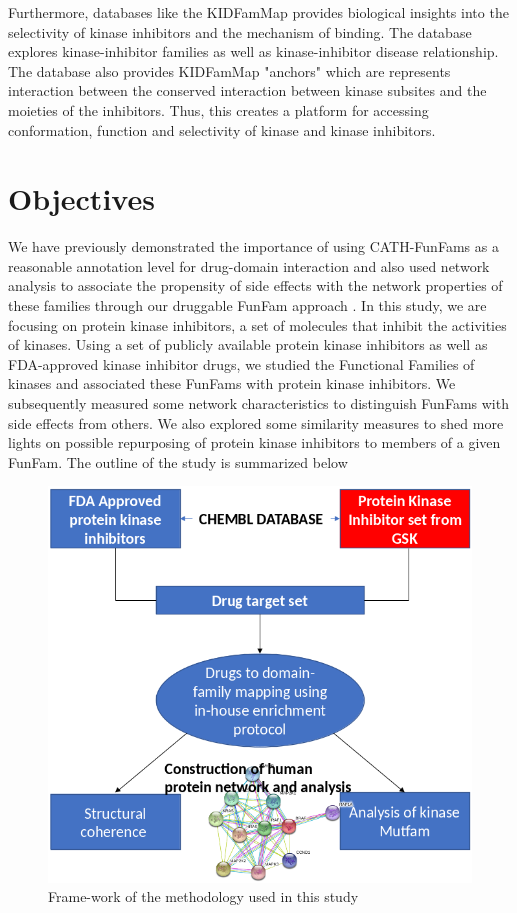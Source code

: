 \documentclass[a4paper, 11pt]{article}
\newcommand{\redcomment}[1]{\textcolor{red}{[#1]}} %
\begin{document}
Furthermore, databases like the KIDFamMap \cite{chiu2012kidfammap} provides biological insights into the selectivity of kinase inhibitors and the mechanism of binding. The database explores kinase-inhibitor families as well as kinase-inhibitor disease relationship. The database also provides KIDFamMap "anchors" which are represents interaction between the conserved interaction between kinase subsites and the moieties of the inhibitors. Thus, this creates a platform for accessing conformation, function and selectivity of kinase and kinase inhibitors. 

\newpage
\section*{Objectives}
We have previously demonstrated the importance of using CATH-FunFams as a reasonable annotation level for drug-domain interaction and also used network analysis to associate the propensity of side effects with the network properties of these families through our druggable FunFam approach \cite{moya2017structural}. In this study, we are focusing on protein kinase inhibitors, a set of molecules that inhibit the activities of kinases. Using a set of publicly available protein kinase inhibitors as well as FDA-approved kinase inhibitor drugs, we studied the Functional Families of kinases and associated these FunFams with protein kinase inhibitors. We subsequently measured some network characteristics to distinguish FunFams with side effects from others. We also explored some similarity measures to shed more lights on possible repurposing of protein kinase inhibitors to members of a given FunFam.
The outline of the study is summarized below\par
\begin{figure}[H]
	\includegraphics[width=.8\linewidth]{figures/framework.png}
	\centering
	\caption{Frame-work of the methodology used in this study}
	\label{framework}
\end{figure}
\end{document}
